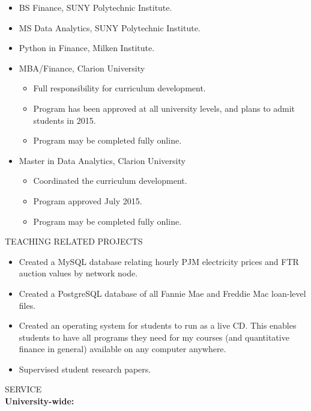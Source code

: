 \documentclass[9pt]{article}
\begin{document}
\begin{itemize}[noitemsep, nolistsep]
\item BS Finance, SUNY Polytechnic Institute.
\item MS Data Analytics, SUNY Polytechnic Institute.
\item Python in Finance, Milken Institute.
\item MBA/Finance, Clarion University
  \begin{itemize}[noitemsep, nolistsep]
    \item Full responsibility for curriculum development.
    \item Program has been approved at all university levels, and plans to admit students in 2015.
    \item Program may be completed fully online.
  \end{itemize}
\item Master in Data Analytics, Clarion University
  \begin{itemize}[noitemsep, nolistsep]
    \item Coordinated the curriculum development.
    \item Program approved July 2015.
    \item Program may be completed fully online.
  \end{itemize}
\end{itemize}
\vspace{10pt}
TEACHING RELATED PROJECTS
\begin{itemize}[noitemsep, nolistsep]
\item Created a MySQL database relating hourly PJM electricity prices and FTR auction values by network node.
\item Created a PostgreSQL database of all Fannie Mae and Freddie Mac loan-level files.
\item Created an operating system for students to run as a live CD. This enables students to have all programs they need for my courses (and quantitative finance in general) available on any computer anywhere.
\item Supervised student research papers.
\end{itemize}
\vspace{10pt}
SERVICE \\
{\bf University-wide:}
\end{document}
